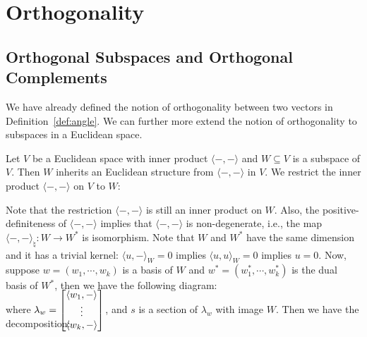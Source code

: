 \section{Orthogonality}

\subsection{Orthogonal Subspaces and Orthogonal Complements}
We have already defined the notion of orthogonality between two vectors in Definition~\ref{def:angle}. We can further more extend the notion of orthogonality to subspaces in a Euclidean space.

Let $V$ be a Euclidean space with inner product $\langle -, - \rangle$ and $W \subseteq V$ is a subspace of $V$. Then $W$ inherits an Euclidean structure from $\langle -, - \rangle$ in $V$. We restrict the inner product $\langle -, - \rangle$ on $V$ to $W$:
\begin{center}
\end{center}
Note that the restriction $\langle -, - \rangle$ is still an inner product on $W$. Also, the positive-definiteness of $\langle -, - \rangle$ implies that $\langle -, - \rangle$ is non-degenerate, i.e., the map $\langle -, - \rangle_{\natural} : W \to W^*$ is isomorphism. Note that $W$ and $W^*$ have the same dimension and it has a trivial kernel: $\langle u, - \rangle_W = 0$ implies $\langle u, u \rangle_W = 0$ implies $u = 0$. Now, suppose $w = (w_1, \cdots, w_k)$ is a basis of $W$ and $w^* = (w_1^*, \cdots, w_k^*)$ is the dual basis of $W^*$, then we have the following diagram:
\begin{center}
\end{center}
where $\lambda_w = \smash{\begin{bmatrix}
			\langle w_1, - \rangle \\
			\vdots                 \\
			\langle w_k, - \rangle
		\end{bmatrix}}$, and $s$ is a section of $\lambda_w$ with image $W$. Then we have the decomposition:
